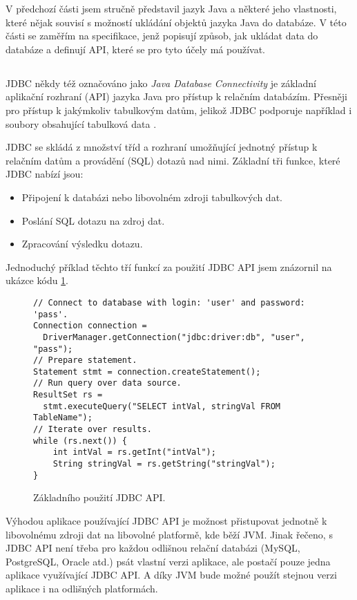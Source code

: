 V předchozí části jsem stručně představil jazyk Java a některé jeho vlastnosti, které nějak souvisí s možností ukládání objektů jazyka Java do databáze. V této části se zaměřím na specifikace, jenž popisují způsob, jak ukládat data do databáze a definují API, které se pro tyto účely má používat. 

\subsection{\jdbc}
JDBC někdy též označováno jako \textit{Java Database Connectivity} je základní aplikační rozhraní (API) jazyka Java pro přístup k relačním databázím. Přesněji pro přístup k jakýmkoliv tabulkovým datům, jelikož JDBC podporuje například i soubory obsahující tabulková data \cite{fisher:jdbc,donahue:jdpb}.

JDBC se skládá z množství tříd a rozhraní umožňující jednotný přístup k relačním datům a provádění (SQL) dotazů nad nimi. Základní tři funkce, které JDBC nabízí jsou:
\begin{itemize}
  \item Připojení k databázi nebo libovolném zdroji tabulkových dat.
  \item Poslání SQL dotazu na zdroj dat.
  \item Zpracování výsledku dotazu.
\end{itemize}

Jednoduchý příklad těchto tří funkcí za použití JDBC API jsem znázornil na ukázce kódu \ref{jdbc:conn}.
\begin{figure}
\begin{lstlisting}
// Connect to database with login: 'user' and password: 'pass'.
Connection connection = 
  DriverManager.getConnection("jdbc:driver:db", "user", "pass");
// Prepare statement.
Statement stmt = connection.createStatement();
// Run query over data source.
ResultSet rs = 
  stmt.executeQuery("SELECT intVal, stringVal FROM TableName");
// Iterate over results.
while (rs.next()) {
    int intVal = rs.getInt("intVal");
    String stringVal = rs.getString("stringVal");
}
\end{lstlisting}
\caption{Základního použití JDBC API.}
\label{jdbc:conn}
\end{figure}


Výhodou aplikace používající JDBC API je možnost přistupovat jednotně k libovolnému zdroji dat na libovolné platformě, kde běží JVM. Jinak řečeno, s JDBC API není třeba pro každou odlišnou relační databázi (MySQL, PostgreSQL, Oracle atd.) psát vlastní verzi aplikace, ale postačí pouze jedna aplikace využívající JDBC API. A díky JVM bude možné použít stejnou verzi aplikace i na odlišných platformách.

